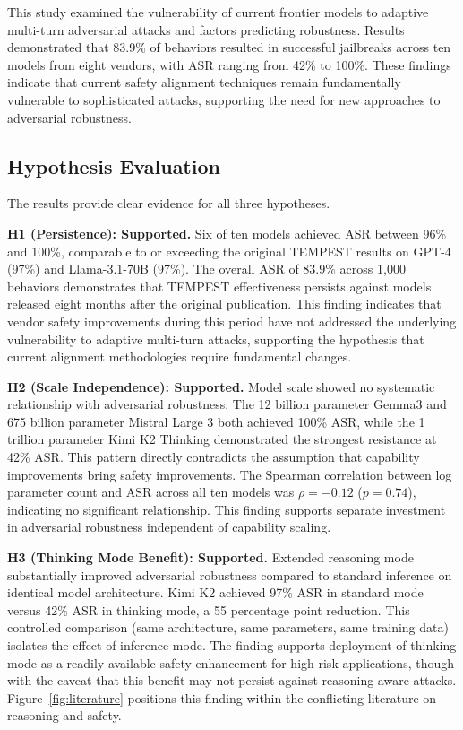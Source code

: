 \documentclass[11pt,a4paper]{article}
\begin{document}
This study examined the vulnerability of current frontier models to adaptive multi-turn adversarial attacks and factors predicting robustness. Results demonstrated that 83.9\% of behaviors resulted in successful jailbreaks across ten models from eight vendors, with ASR ranging from 42\% to 100\%. These findings indicate that current safety alignment techniques remain fundamentally vulnerable to sophisticated attacks, supporting the need for new approaches to adversarial robustness.

\subsection{Hypothesis Evaluation}

The results provide clear evidence for all three hypotheses.

\textbf{H1 (Persistence): Supported.} Six of ten models achieved ASR between 96\% and 100\%, comparable to or exceeding the original TEMPEST results on GPT-4 (97\%) and Llama-3.1-70B (97\%). The overall ASR of 83.9\% across 1,000 behaviors demonstrates that TEMPEST effectiveness persists against models released eight months after the original publication. This finding indicates that vendor safety improvements during this period have not addressed the underlying vulnerability to adaptive multi-turn attacks, supporting the hypothesis that current alignment methodologies require fundamental changes.

\textbf{H2 (Scale Independence): Supported.} Model scale showed no systematic relationship with adversarial robustness. The 12 billion parameter Gemma3 and 675 billion parameter Mistral Large 3 both achieved 100\% ASR, while the 1 trillion parameter Kimi K2 Thinking demonstrated the strongest resistance at 42\% ASR. This pattern directly contradicts the assumption that capability improvements bring safety improvements. The Spearman correlation between log parameter count and ASR across all ten models was $\rho = -0.12$ ($p = 0.74$), indicating no significant relationship. This finding supports separate investment in adversarial robustness independent of capability scaling.

\textbf{H3 (Thinking Mode Benefit): Supported.} Extended reasoning mode substantially improved adversarial robustness compared to standard inference on identical model architecture. Kimi K2 achieved 97\% ASR in standard mode versus 42\% ASR in thinking mode, a 55 percentage point reduction. This controlled comparison (same architecture, same parameters, same training data) isolates the effect of inference mode. The finding supports deployment of thinking mode as a readily available safety enhancement for high-risk applications, though with the caveat that this benefit may not persist against reasoning-aware attacks. Figure~\ref{fig:literature} positions this finding within the conflicting literature on reasoning and safety.
\end{document}
